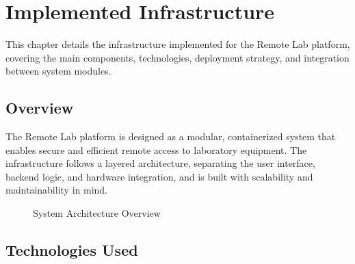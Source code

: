 %
%
\chapter{Implemented Infrastructure} \label{cap:implemented-infrastructure}

This chapter details the infrastructure implemented for the Remote Lab platform, covering the main components, technologies, deployment strategy, and integration between system modules.

\section{Overview}

The Remote Lab platform is designed as a modular, containerized system that enables secure and efficient remote access to laboratory equipment. The infrastructure follows a layered architecture, separating the user interface, backend logic, and hardware integration, and is built with scalability and maintainability in mind.

\begin{figure}[H]
    \centering
    
    \caption{System Architecture Overview}
    \label{fig:system-architecture}
\end{figure}









\section{Technologies Used}


